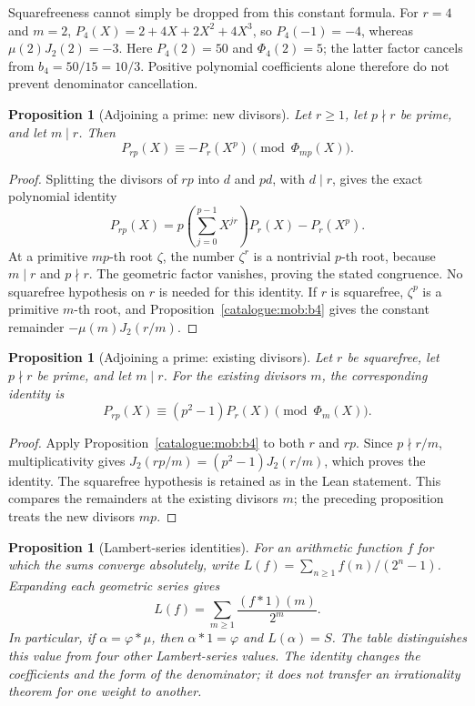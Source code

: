 \documentclass[11pt]{article}
\theoremstyle{plain}
\newtheorem{prop}[thm]{Proposition}
\theoremstyle{definition}
\theoremstyle{remark}
\begin{document}
Squarefreeness cannot simply be dropped from this constant formula.
For $r=4$ and $m=2$,
$P_4(X)=2+4X+2X^2+4X^3$, so $P_4(-1)=-4$, whereas
$\mu(2)J_2(2)=-3$. Here $P_4(2)=50$ and $\Phi_4(2)=5$;
the latter factor cancels from $b_4=50/15=10/3$. Positive polynomial
coefficients alone therefore do not prevent denominator cancellation.


\begin{prop}[Adjoining a prime: new divisors]\label{catalogue:mob:b8a}
Let $r\ge1$, let $p\nmid r$ be prime, and let $m\mid r$. Then
\[
 P_{rp}(X)\equiv-P_r(X^p)\pmod{\Phi_{mp}(X)}.
\]
\end{prop}

\begin{proof}
Splitting the divisors of $rp$ into $d$ and $pd$, with $d\mid r$,
gives the exact polynomial identity
\[
 P_{rp}(X)=p\left(\sum_{j=0}^{p-1}X^{jr}\right)P_r(X)-P_r(X^p).
\]
At a primitive $mp$-th root $\zeta$, the number $\zeta^r$ is a
nontrivial $p$-th root, because $m\mid r$ and $p\nmid r$.
The geometric factor vanishes, proving the stated congruence.
No squarefree hypothesis on $r$ is needed for this identity.
If $r$ is squarefree, $\zeta^p$ is a primitive $m$-th root, and
Proposition~\ref{catalogue:mob:b4} gives the constant remainder
$-\mu(m)J_2(r/m)$.
\end{proof}


\begin{prop}[Adjoining a prime: existing divisors]\label{catalogue:mob:b8b}
Let $r$ be squarefree, let $p\nmid r$ be prime, and let $m\mid r$.
For the existing divisors $m$, the corresponding identity is
\[
 P_{rp}(X)\equiv(p^2-1)P_r(X)\pmod{\Phi_m(X)}.
\]
\end{prop}

\begin{proof}
Apply Proposition~\ref{catalogue:mob:b4} to both $r$ and $rp$.
Since $p\nmid r/m$, multiplicativity gives
$J_2(rp/m)=(p^2-1)J_2(r/m)$, which proves the identity.
The squarefree hypothesis is retained as in the Lean statement.
This compares the remainders at the existing divisors $m$; the
preceding proposition treats the new divisors $mp$.
\end{proof}


\begin{prop}[Lambert-series identities]\label{catalogue:cert:d7}
For an arithmetic function $f$ for which the sums converge absolutely,
write $L(f)=\sum_{n\ge1}f(n)/(2^n-1)$. Expanding each geometric series gives
\[
 L(f)=\sum_{m\ge1}\frac{(f*1)(m)}{2^m}.
\]
In particular, if $\alpha=\varphi*\mu$, then $\alpha*1=\varphi$ and
$L(\alpha)=S$. The table distinguishes this value from four other
Lambert-series values. The identity changes the coefficients and the
form of the denominator; it does not transfer an irrationality theorem
for one weight to another.
\end{prop}
\end{document}
